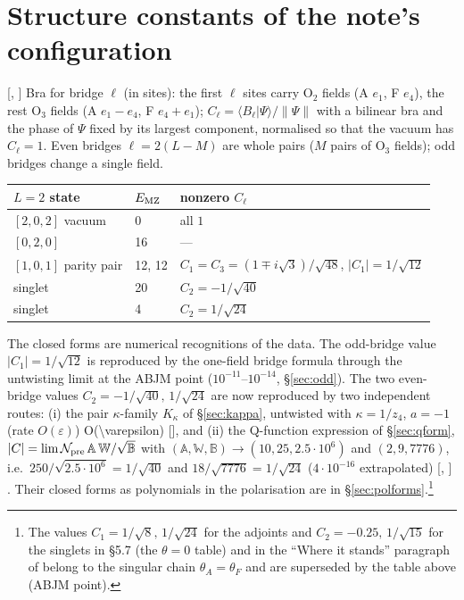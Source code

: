 \section{Structure constants of the note's configuration}\label{sec:C}

[, ] Bra for bridge $\ell$ (in sites): the first $\ell$ sites carry O$_2$ fields (A $e_1$, F $e_4$),
the rest O$_3$ fields (A $e_1-e_4$, F $e_4+e_1$); $C_\ell=\langle B_\ell|\Psi\rangle/\|\Psi\|$ with a bilinear bra and the phase of $\Psi$ fixed
by its largest component, normalised so that the vacuum has $C_\ell=1$. Even bridges $\ell=2(L-M)$ are whole pairs ($M$ pairs of O$_3$ fields); odd bridges change a single field.
\begin{center}
\begin{tabular}{lll}
\toprule
$L=2$ state & $E_{\rm MZ}$ & nonzero $C_\ell$\\
\midrule
$[2,0,2]$ vacuum & 0 & all $1$\\
$[0,2,0]$ & 16 & ---\\
$[1,0,1]$ parity pair & 12, 12 & $C_1=C_3=(1\mp i\sqrt3)/\sqrt{48}$, $|C_1|=1/\sqrt{12}$\\
singlet & 20 & $C_2=-1/\sqrt{40}$\\
singlet & 4 & $C_2=1/\sqrt{24}$\\
\bottomrule
\end{tabular}
\end{center}
The closed forms are numerical recognitions of the data. The odd-bridge value $|C_1|=1/\sqrt{12}$ is reproduced by the one-field bridge formula through the untwisting limit at the ABJM point
($10^{-11}$--$10^{-14}$, \S\ref{sec:odd}). The two even-bridge values $C_2=-1/\sqrt{40},\,1/\sqrt{24}$ are now reproduced by two independent routes: (i) the pair $\kappa$-family $K_\kappa$ of \S\ref{sec:kappa}, untwisted
with $\kappa=1/z_4$, $a=-1$ (rate $O(\varepsilon)$) \num{O(\varepsilon)} [], and (ii) the Q-function expression of \S\ref{sec:qform}, $|C|=\lim\mathcal N_{\rm pre}\,\mathbb A\,\mathbb W/\sqrt{\mathbb B}$ with
$(\mathbb A,\mathbb W,\mathbb B)\to(10,25,2.5\cdot10^6)$ and $(2,9,7776)$, i.e.\ $250/\sqrt{2.5\cdot10^6}=1/\sqrt{40}$ and $18/\sqrt{7776}=1/\sqrt{24}$ ($4\cdot10^{-16}$ extrapolated)
[, ] \hp. Their closed forms as polynomials in the polarisation are in \S\ref{sec:polforms}.\footnote{The values $C_1=1/\sqrt8,\,1/\sqrt{24}$ for the adjoints and
$C_2=-0.25,\,1/\sqrt{15}$ for the singlets in  \S5.7 (the $\theta=0$ table) and in the ``Where it stands'' paragraph of  belong to the singular chain $\theta_A=\theta_F$ and are superseded by the table above (ABJM point).}

